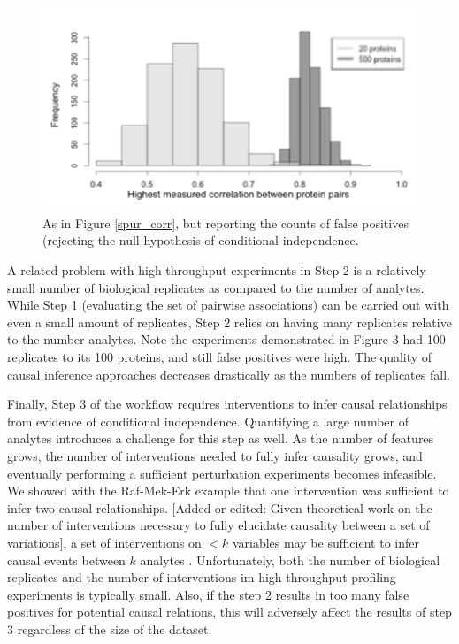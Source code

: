 \documentclass[journal=jacsat,manuscript=article]{achemso}
\def\added#1{{\color{magenta}[Added or edited: #1]}}
\begin{document}
\begin{figure}[!tpb]
\centerline{\includegraphics[width=1\textwidth]{figs/spurious_dep.png}}
\caption{As in Figure \ref{spur_corr}, but reporting the counts of false positives (rejecting the null hypothesis of conditional independence.}
\label{spur_dep}
\end{figure}

A related problem with high-throughput experiments in Step 2 is a relatively small number of biological replicates as compared to the number of analytes. While Step 1 (evaluating the set of pairwise associations) can be carried out with even a small amount of replicates, Step 2 relies on having many replicates relative to the number analytes.  Note the experiments demonstrated in Figure 3 had 100 replicates to its 100 proteins, and still false positives were high.  The quality of causal inference approaches decreases drastically as the numbers of replicates fall.    

Finally, Step 3 of the workflow requires interventions to infer causal relationships from evidence of conditional independence.  Quantifying a large number of analytes introduces a  challenge for this step as well. As the number of features grows, the number of interventions needed to fully infer causality grows, and eventually performing a sufficient perturbation experiments becomes infeasible.   We showed with the Raf-Mek-Erk example that one intervention was sufficient to infer two causal relationships. \added{Given theoretical work on the number of interventions necessary to fully elucidate causality between a set of variations\cite{eberhardt2012number}\cite{hauser2012two}\cite{hyttinen2013experiment}}, a set of interventions on $< k$ variables may be sufficient to infer causal events between $k$ analytes . Unfortunately, both the number of biological replicates and the number of interventions im high-throughput profiling experiments is typically small.  Also, if the step 2 results in too many false positives for potential causal relations, this will adversely affect the results of step 3 regardless of the size of the dataset.
\end{document}
